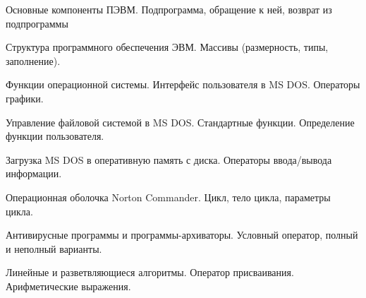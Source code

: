\documentclass[
	14pt,
	a4paper,
	]
	{scrartcl}
\begin{document}
\shapk
{}
\setcounter{zad}{0}

\vfill
\z Основные компоненты ПЭВМ.
 \vfill
\z Подпрограмма, обращение к ней, возврат из подпрограммы \vfill

\vfill

\newpage


\shapk
{}
\setcounter{zad}{0}

\vfill
\z Структура программного обеспечения ЭВМ.
 \vfill
\z Массивы (размерность, типы, заполнение). 
 \vfill

\vfill

\newpage


\shapk
{}
\setcounter{zad}{0}

\vfill
\z Функции операционной системы. Интерфейс пользователя в MS DOS.
 \vfill
\z Операторы графики.
 \vfill

\vfill

\newpage


\shapk
{}
\setcounter{zad}{0}

\vfill
\z Управление файловой системой в MS DOS.
 \vfill
\z Стандартные функции. Определение функции пользователя. 
 \vfill

\vfill

\newpage


\shapk
{}
\setcounter{zad}{0}

\vfill
\z Загрузка MS DOS в оперативную память с диска.
 \vfill
\z Операторы ввода/вывода информации. 
 \vfill

\vfill

\newpage


\shapk
{}
\setcounter{zad}{0}

\vfill
\z Операционная оболочка Norton Commander.
 \vfill
\z Цикл, тело цикла, параметры цикла. 
 \vfill

\vfill

\newpage


\shapk
{}
\setcounter{zad}{0}

\vfill
\z Антивирусные программы и программы-архиваторы.
 \vfill
\z Условный оператор, полный и неполный варианты. 
 \vfill

\vfill

\newpage


\shapk
{}
\setcounter{zad}{0}

\vfill
\z Линейные и разветвляющиеся алгоритмы.
 \vfill
\z Оператор присваивания. Арифметические выражения. 
 \vfill
\end{document}
